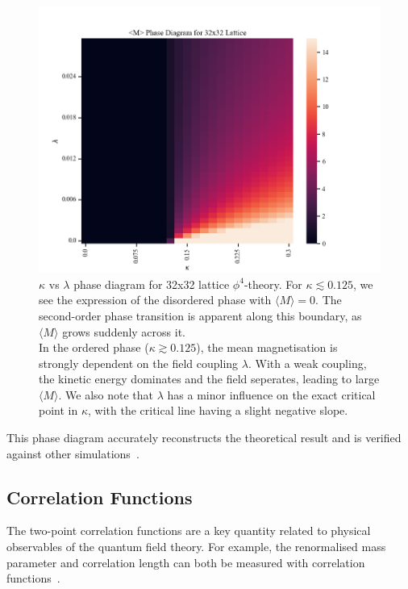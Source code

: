 \documentclass[11pt]{article}
\begin{document}
    \begin{figure}[t!]
        \center
        \includegraphics[width=\linewidth]{../figures/PhaseDiagram}
        \caption{
            $\kappa$ vs $\lambda$ phase diagram for 32x32 lattice $\phi^4$-theory.
            For $\kappa \lesssim 0.125$, we see the expression of the disordered phase with $\langle M \rangle = 0$.
            The second-order phase transition is apparent along this boundary, as $\langle M \rangle$ grows suddenly
            across it. \\
            In the ordered phase ($\kappa \gtrsim 0.125$), the mean magnetisation is strongly dependent on the field
            coupling $\lambda$.
            With a weak coupling, the kinetic energy dominates and the field seperates, leading to
            large $\langle M \rangle$.
            We also note that $\lambda$ has a minor influence on the exact critical point in $\kappa$, with the
            critical line having a slight negative slope.
        }\label{fig:phase_diagram}
    \end{figure}

    This phase diagram accurately reconstructs the theoretical result and is verified against other
    simulations~\cite{Pawlowski_2020}.

\subsection{Correlation Functions}\label{subsec:correlation_function}
    The two-point correlation functions are a key quantity related to physical
    observables of the quantum field theory.
    For example, the renormalised mass parameter and correlation length can both be measured with correlation
    functions~\cite{maas2020lattice}.
\end{document}
